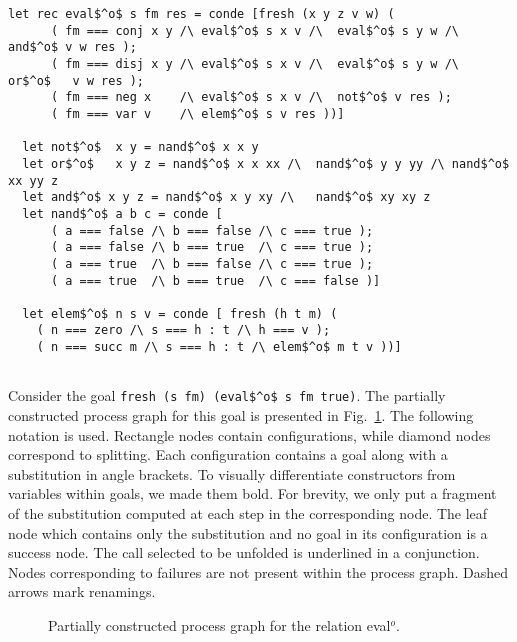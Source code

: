 \begin{figure*}[!t]
  \centering
  \begin{minipage}{0.95\textwidth}
    \begin{lstlisting}[label={eval:whole}, caption={Evaluator of propositional formulas}, captionpos=b, frame=tb]
  let rec eval$^o$ s fm res = conde [fresh (x y z v w) (
      ( fm === conj x y /\ eval$^o$ s x v /\  eval$^o$ s y w /\  and$^o$ v w res );
      ( fm === disj x y /\ eval$^o$ s x v /\  eval$^o$ s y w /\  or$^o$   v w res );
      ( fm === neg x    /\ eval$^o$ s x v /\  not$^o$ v res );
      ( fm === var v    /\ elem$^o$ s v res ))]

  let not$^o$  x y = nand$^o$ x x y
  let or$^o$   x y z = nand$^o$ x x xx /\  nand$^o$ y y yy /\ nand$^o$ xx yy z
  let and$^o$ x y z = nand$^o$ x y xy /\   nand$^o$ xy xy z
  let nand$^o$ a b c = conde [
      ( a === false /\ b === false /\ c === true );
      ( a === false /\ b === true  /\ c === true );
      ( a === true  /\ b === false /\ c === true );
      ( a === true  /\ b === true  /\ c === false )]

  let elem$^o$ n s v = conde [ fresh (h t m) (
    ( n === zero /\ s === h : t /\ h === v );
    ( n === succ m /\ s === h : t /\ elem$^o$ m t v ))]


    \end{lstlisting}
  \end{minipage}
\end{figure*}

Consider the goal \lstinline{fresh (s fm) (eval$^o$ s fm true)}.
The partially constructed process graph for this goal is presented in Fig.~\ref{fig:evalTree}.
The following notation is used.
Rectangle nodes contain configurations, while diamond nodes correspond to splitting.
Each configuration contains a goal along with a substitution in angle brackets.
To visually differentiate constructors from variables within goals, we made them bold.
For brevity, we only put a fragment of the substitution computed at each step in the corresponding node.
The leaf node which contains only the substitution and no goal in its configuration is a success node.
The call selected to be unfolded is underlined in a conjunction.
Nodes corresponding to failures are not present within the process graph.
Dashed arrows mark renamings.

\begin{figure}[!t]
  \centering
  \begin{minipage}{0.95\textwidth}
    
  \end{minipage}
  \caption{Partially constructed process graph for the relation eval$^o$.}
  \label{fig:evalTree}
\end{figure}


